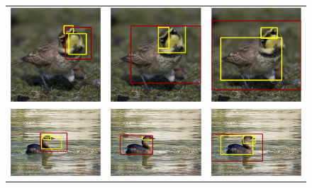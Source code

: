 \begin{figure}
\begin{center}
\begin{tabular}{ccc}
\includegraphics[width=0.3\linewidth]{6_strong_dpm.jpg} &
\includegraphics[width=0.3\linewidth]{6_individual.jpg} &
\includegraphics[width=0.3\linewidth]{6_neighbor.jpg} \\
\includegraphics[trim=0mm 10mm 0mm 10mm, clip, width=0.3\linewidth]{11_strong_dpm.jpg} &
\includegraphics[trim=0mm 10mm 0mm 10mm, clip, width=0.3\linewidth]{11_individual.jpg} &
\includegraphics[trim=0mm 10mm 0mm 10mm, clip, width=0.3\linewidth]{11_neighbor.jpg} \\

\end{tabular}
\end{center}
\end{figure}
